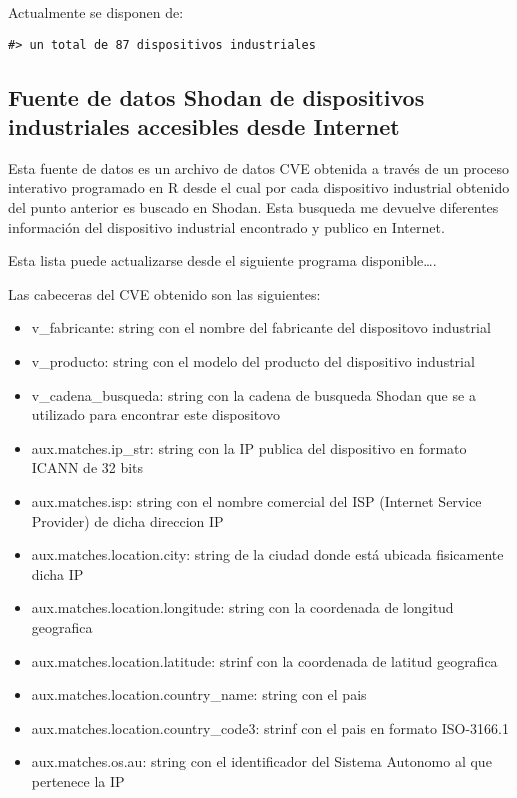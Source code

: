 \documentclass[]{article}
\providecommand{\tightlist}{%
  \setlength{\itemsep}{0pt}\setlength{\parskip}{0pt}}
\begin{document}
Actualmente se disponen de:

\begin{verbatim}
#> un total de 87 dispositivos industriales
\end{verbatim}

\subsection{Fuente de datos Shodan de dispositivos industriales
accesibles desde
Internet}\label{fuente-de-datos-shodan-de-dispositivos-industriales-accesibles-desde-internet}

Esta fuente de datos es un archivo de datos CVE obtenida a través de un
proceso interativo programado en R desde el cual por cada dispositivo
industrial obtenido del punto anterior es buscado en Shodan. Esta
busqueda me devuelve diferentes información del dispositivo industrial
encontrado y publico en Internet.

Esta lista puede actualizarse desde el siguiente programa
disponible\ldots{}.

Las cabeceras del CVE obtenido son las siguientes:

\begin{itemize}
\tightlist
\item
  v\_fabricante: string con el nombre del fabricante del dispositovo
  industrial
\item
  v\_producto: string con el modelo del producto del dispositivo
  industrial
\item
  v\_cadena\_busqueda: string con la cadena de busqueda Shodan que se a
  utilizado para encontrar este dispositovo
\item
  aux.matches.ip\_str: string con la IP publica del dispositivo en
  formato ICANN de 32 bits
\item
  aux.matches.isp: string con el nombre comercial del ISP (Internet
  Service Provider) de dicha direccion IP
\item
  aux.matches.location.city: string de la ciudad donde está ubicada
  fisicamente dicha IP
\item
  aux.matches.location.longitude: string con la coordenada de longitud
  geografica
\item
  aux.matches.location.latitude: strinf con la coordenada de latitud
  geografica
\item
  aux.matches.location.country\_name: string con el pais
\item
  aux.matches.location.country\_code3: strinf con el pais en formato
  ISO-3166.1
\item
  aux.matches.os.au: string con el identificador del Sistema Autonomo al
  que pertenece la IP
\end{itemize}
\end{document}
